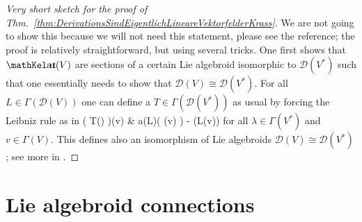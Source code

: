 \begin{proof}[Very short sketch for the proof of Thm.~\ref{thm:DerivationsSindEigentlichLineareVektorfelderKrass}]
\leavevmode\newline
We are not going to show this because we will not need this statement, please see the reference; the proof is relatively straightforward, but using several tricks. One first shows that $\saut(V)$ are sections of a certain Lie algebroid isomorphic to $\mathcal{D}(V^*)$ such that one essentially needs to show that $\mathcal{D}(V) \cong \mathcal{D}(V^*)$. For all $L \in \Gamma(\mathcal{D}(V))$ one can define a $T \in \Gamma(\mathcal{D}(V^*))$ as usual by forcing the Leibniz rule as in
\bas
\bigl( T(\lambda) \bigr)(v)
&\coloneqq
a(L)\bigl( \lambda(v) \bigr)
	- \lambda\bigl(L(v)\bigr)
\eas
for all $\lambda \in \Gamma(V^*)$ and $v \in \Gamma(V)$. This defines also an isomorphism of Lie algebroids $\mathcal{D}(V) \cong \mathcal{D}(V^*)$; see more in \cite[discussion after Corollary 3.4.3; page 114ff.]{mackenzieGeneralTheory}.
\end{proof}

%
%
\section{Lie algebroid connections}\label{SubsectionEDiffstuff}

